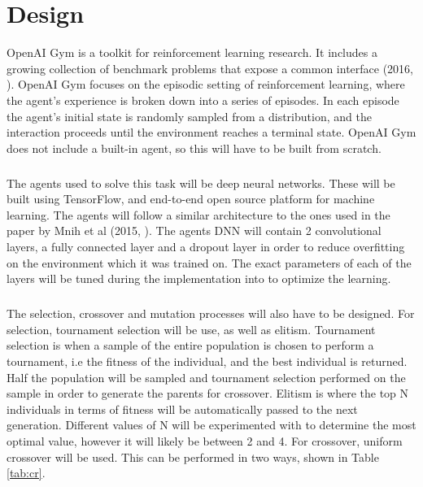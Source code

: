 \chapter{Design}

OpenAI Gym is a toolkit for reinforcement learning research. It includes a growing collection of benchmark problems that expose a common interface (2016, \cite{gym}). OpenAI Gym focuses on the episodic setting of reinforcement learning, where the agent's experience is broken down into a series of episodes. In each episode the agent's initial state is randomly sampled from a distribution, and the interaction proceeds until the environment reaches a terminal state. OpenAI Gym does not include a built-in agent, so this will have to be built from scratch.

\paragraph{}

The agents used to solve this task will be deep neural networks. These will be built using TensorFlow, and end-to-end open source platform for machine learning. The agents will follow a similar architecture to the ones used in the paper by Mnih et al (2015, \cite{mnih}). The agents DNN will contain 2 convolutional layers, a fully connected layer and a dropout layer in order to reduce overfitting on the environment which it was trained on. The exact parameters of each of the layers will be tuned during the implementation into to optimize the learning.

\paragraph{}

The selection, crossover and mutation processes will also have to be designed. For selection, tournament selection will be use, as well as elitism. Tournament selection is when a sample of the entire population is chosen to perform a tournament, i.e the fitness of the individual, and the best individual is returned. Half the population will be sampled and tournament selection performed on the sample in order to generate the parents for crossover. Elitism is where the top N individuals in terms of fitness will be automatically passed to the next generation. Different values of N will be experimented with to determine the most optimal value, however it will likely be between 2 and 4. For crossover, uniform crossover will be used. This can be performed in two ways, shown in Table \ref{tab:cr}.

